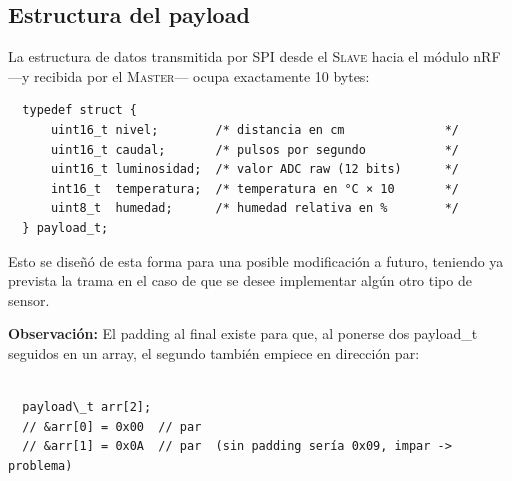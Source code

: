 \documentclass[12pt,a4paper]{article}
\begin{document}
  \subsection{Estructura del payload}                                                                                                                                                                                                                         
  
  La estructura de datos transmitida por SPI desde el \textsc{Slave} hacia el módulo nRF —y recibida por el \textsc{Master}— ocupa exactamente 10 bytes:                                                                                                      
  
  \begin{verbatim}                                                                                                                                                                                                                                            
  typedef struct {
      uint16_t nivel;        /* distancia en cm              */
      uint16_t caudal;       /* pulsos por segundo           */                                                                                                                                                                                               
      uint16_t luminosidad;  /* valor ADC raw (12 bits)      */
      int16_t  temperatura;  /* temperatura en °C × 10       */                                                                                                                                                                                               
      uint8_t  humedad;      /* humedad relativa en %        */
  } payload_t;                                                                                                                                                                                                                                                
  \end{verbatim}
  
  Esto se diseñó de esta forma para una posible modificación a futuro, teniendo ya prevista la trama en el caso de que se desee implementar algún otro tipo de sensor.
  
    \textbf{Observación: }  El padding al final existe para que, al ponerse dos payload\_t seguidos en un     
  array, el segundo también empiece en dirección par:                           

\begin{verbatim}

  payload\_t arr[2];                                                             
  // &arr[0] = 0x00  // par
  // &arr[1] = 0x0A  // par  (sin padding sería 0x09, impar -> problema)          
  
\end{verbatim}
\end{document}
